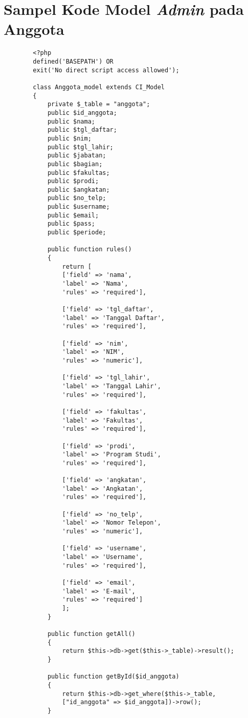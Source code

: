 \appendix 

\chapter{Sampel Kode Model \textit{Admin} pada Anggota}
\begin{verbatim}
		<?php 
		defined('BASEPATH') OR 
		exit('No direct script access allowed');
		
		class Anggota_model extends CI_Model
		{
			private $_table = "anggota";
			public $id_anggota;
			public $nama;
			public $tgl_daftar;
			public $nim;
			public $tgl_lahir;
			public $jabatan;
			public $bagian;
			public $fakultas;
			public $prodi;
			public $angkatan;
			public $no_telp;
			public $username;
			public $email;
			public $pass;
			public $periode;
		
			public function rules()
			{
				return [
				['field' => 'nama',
				'label' => 'Nama',
				'rules' => 'required'],
				
				['field' => 'tgl_daftar',
				'label' => 'Tanggal Daftar',
				'rules' => 'required'],
				
				['field' => 'nim',
				'label' => 'NIM',
				'rules' => 'numeric'],
				
				['field' => 'tgl_lahir',
				'label' => 'Tanggal Lahir',
				'rules' => 'required'],
				
				['field' => 'fakultas',
				'label' => 'Fakultas',
				'rules' => 'required'],
				
				['field' => 'prodi',
				'label' => 'Program Studi',
				'rules' => 'required'],
				
				['field' => 'angkatan',
				'label' => 'Angkatan',
				'rules' => 'required'],
				
				['field' => 'no_telp',
				'label' => 'Nomor Telepon',
				'rules' => 'numeric'],
				
				['field' => 'username',
				'label' => 'Username',
				'rules' => 'required'],
				
				['field' => 'email',
				'label' => 'E-mail',
				'rules' => 'required']
				];
			}
			
			public function getAll()
			{
				return $this->db->get($this->_table)->result();
			}
			
			public function getById($id_anggota)
			{
				return $this->db->get_where($this->_table, 
				["id_anggota" => $id_anggota])->row();
			}
			

\end{verbatim}

